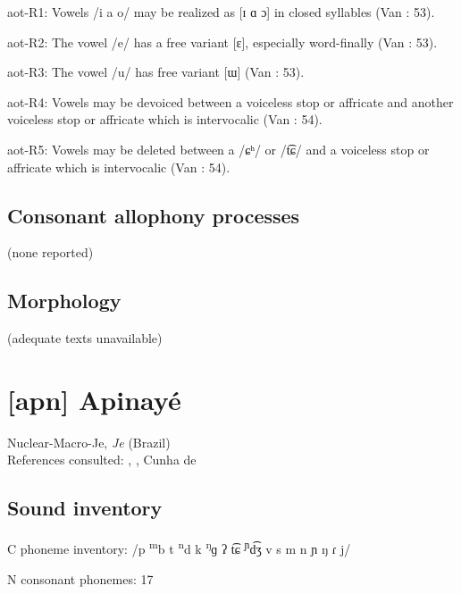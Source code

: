 {\begin{appendixdesc}
\item[aot-R1:] Vowels /i a o/ may be realized as [ɪ ɑ ɔ] in closed syllables (Van \citealt{Breugel2008}: 53).

\item[aot-R2:] The vowel /e/ has a free variant [ɛ], especially word-finally (Van \citealt{Breugel2008}: 53).

\item[aot-R3:] The vowel /u/ has free variant [ɯ] (Van \citealt{Breugel2008}: 53).

\item[aot-R4:] Vowels may be devoiced between a voiceless stop or affricate and another voiceless stop or affricate which is intervocalic (Van \citealt{Breugel2008}: 54).

\item[aot-R5:] Vowels may be deleted between a /ɕʰ/ or /t͡ɕ/ and a voiceless stop or affricate which is intervocalic (Van \citealt{Breugel2008}: 54).
\end{appendixdesc}
\subsection*{Consonant allophony processes}
(none reported)

\subsection*{Morphology}
(adequate texts unavailable)

\section*{[apn] Apinayé}   %
Nuclear-Macro-Je, \textit{Je} (Brazil)\medskip\\
References consulted: \citet{BurgessHam1968}, \citet{Ham2009}, Cunha de \citet{Oliveira2005}

\subsection*{Sound inventory}
\begin{appendixdesc}

\item[C phoneme inventory:] /p \textsuperscript{m}b t \textsuperscript{n}d k \textsuperscript{ŋ}ɡ ʔ t͡ɕ \textsuperscript{ɲ}d͡ʒ v s m n ɲ ŋ ɾ j/

\item[N consonant phonemes:] 17


\end{appendixdesc}}
